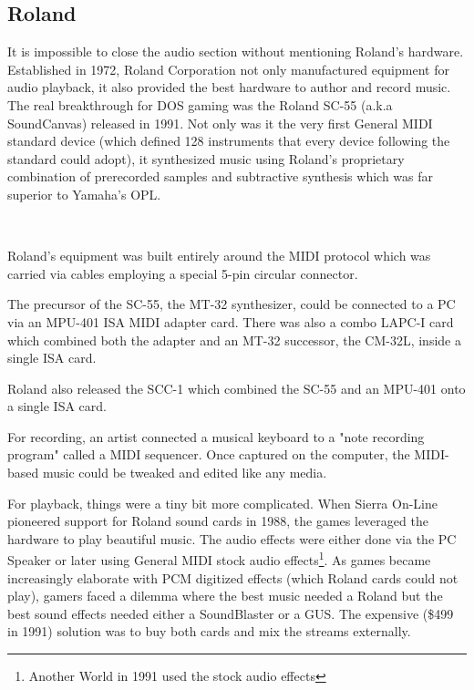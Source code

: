  \subsection{Roland}
 It is impossible to close the audio section without mentioning Roland's hardware. Established in 1972, Roland Corporation not only manufactured equipment for audio playback, it also provided the best hardware to author and record music. The real breakthrough for DOS gaming was the Roland SC-55 (a.k.a SoundCanvas) released in 1991. Not only was it the very first General MIDI standard device (which defined 128 instruments that every device following the standard could adopt), it synthesized music using Roland's proprietary combination of prerecorded samples and subtractive synthesis which was far superior to Yamaha's OPL.\\
 \par
 \\
 \par

Roland's equipment was built entirely around the MIDI protocol which was carried via cables employing a special 5-pin circular connector.\\
\par
 The precursor of the SC-55, the MT-32 synthesizer, could be connected to a PC via an MPU-401 ISA MIDI adapter card. There was also a combo LAPC-I card which combined both the adapter and an MT-32 successor, the CM-32L, inside a single ISA card.\\
\par 
{}
\par
Roland also released the SCC-1 which combined the SC-55 and an MPU-401 onto a single ISA card.\\
\par 
{}
\par
\pagebreak
For recording, an artist connected a musical keyboard to a "note recording program" called a MIDI sequencer. Once captured on the computer, the MIDI-based music could be tweaked and edited like any media.\\

\par
For playback, things were a tiny bit more complicated. When Sierra On-Line pioneered support for Roland sound cards in 1988, the games leveraged the hardware to play beautiful music. The audio effects were either done via the PC Speaker or later using General MIDI stock audio effects\footnote{Another World in 1991 used the stock audio effects}. As games became increasingly elaborate with PCM digitized effects (which Roland cards could not play), gamers faced a dilemma where the best music needed a Roland but the best sound effects needed either a SoundBlaster or a GUS. The expensive (\$499 in 1991) solution was to buy both cards and mix the streams externally.\\
\par
{}

